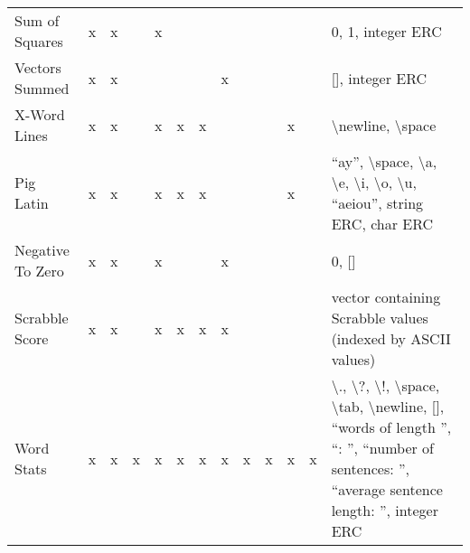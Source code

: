\documentclass{sig-alternate}
\begin{document}
\begin{table*}[h]
\begin{tabular}{|l|ccccccccccc|p{6cm}|}
Sum of Squares             & x    & x       &       & x       &      &        &                    &                  &                   &       &            & 0, 1, integer ERC                                                                                                                                                                                                           \\
Vectors Summed             & x    & x       &       &         &      &        & x                  &                  &                   &       &            & {[}{]}, integer ERC                                                                                                                                                                                                         \\
X-Word Lines               & x    & x       &       & x       & x    & x      &                    &                  &                   & x     &            & \textbackslash newline, \textbackslash space                                                                                                                                                                                \\
Pig Latin                  & x    & x       &       & x       & x    & x      &                    &                  &                   & x     &            & ``ay'', \textbackslash space, \textbackslash a, \textbackslash e, \textbackslash i, \textbackslash o, \textbackslash u, ``aeiou'', string ERC, char ERC                                                                         \\
Negative To Zero           & x    & x       &       & x       &      &        & x                  &                  &                   &       &            & 0, {[}{]}                                                                                                                                                                                                                   \\
Scrabble Score             & x    & x       &       & x       & x    & x      & x                  &                  &                   &       &            & vector containing Scrabble values (indexed by ASCII values)                                                                                                                                                                 \\
Word Stats                 & x    & x       & x     & x       & x    & x      & x                  & x                & x                 & x     & x          & \textbackslash ., \textbackslash ?, \textbackslash !, \textbackslash space, \textbackslash tab, \textbackslash newline, {[}{]}, ``words of length '', ``: '', ``number of sentences: '', ``average sentence length: '', integer ERC \\

\end{tabular}
\end{table*}
\end{document}
